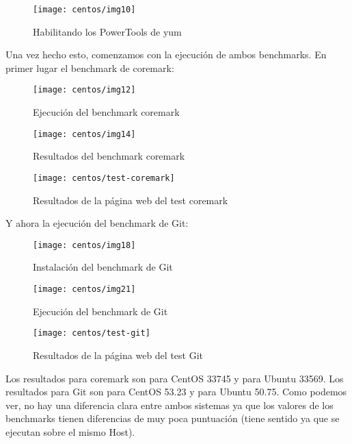 \begin{figure}[H]
    \centering
    \texttt{[image: centos/img10]}
    \caption{Habilitando los PowerTools de yum}
\end{figure}

\newpage
Una vez hecho esto, comenzamos con la ejecución de ambos benchmarks. En primer lugar el benchmark de coremark:

\begin{figure}[H]
    \centering
    \texttt{[image: centos/img12]}
    \caption{Ejecución del benchmark coremark}
\end{figure}

\begin{figure}[H]
    \centering
    \texttt{[image: centos/img14]}
    \caption{Resultados del benchmark coremark}
\end{figure}

\begin{figure}[H]
    \centering
    \texttt{[image: centos/test-coremark]}
    \caption{Resultados de la página web del test coremark}
\end{figure}

\newpage
Y ahora la ejecución del benchmark de Git:

\begin{figure}[H]
    \centering
    \texttt{[image: centos/img18]}
    \caption{Instalación del benchmark de Git}
\end{figure}

\begin{figure}[H]
    \centering
    \texttt{[image: centos/img21]}
    \caption{Ejecución del benchmark de Git}
\end{figure}

\begin{figure}[H]
    \centering
    \texttt{[image: centos/test-git]}
    \caption{Resultados de la página web del test Git}
\end{figure}

Los resultados para coremark son para CentOS 33745 y para Ubuntu 33569.
Los resultados para Git son para CentOS 53.23 y para Ubuntu 50.75.
Como podemos ver, no hay una diferencia clara entre ambos sistemas ya que los valores de los benchmarks tienen diferencias de muy poca puntuación (tiene sentido ya que se ejecutan sobre el mismo Host).



